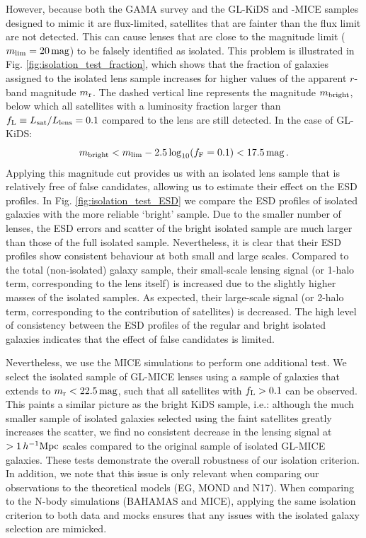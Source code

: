 \documentclass[usenatbib]{mnras}
\newcommand{\hMpc}{\, h^{-1}{\rm{Mpc}} }
\newcommand{\magn}{\, {\rm mag} }
\newcommand{\un}[1]{_{\rm #1}}
\begin{document}
However, because both the GAMA survey and the GL-KiDS and -MICE samples designed to mimic it are flux-limited, satellites that are fainter than the flux limit are not detected. This can cause lenses that are close to the magnitude limit ($m\un{lim}=20 \magn$) to be falsely identified as isolated. This problem is illustrated in Fig. \ref{fig:isolation_test_fraction}, which shows that the fraction of galaxies assigned to the isolated lens sample increases for higher values of the apparent $r$-band magnitude $m\un{r}$. The dashed vertical line represents the magnitude $m\un{bright}$, below which all satellites with a luminosity fraction larger than $f\un{L} \equiv L\un{sat}/L\un{lens}=0.1$ compared to the lens are still detected. In the case of GL-KiDS:
\begin{equation}
	m\un{bright} < m\un{lim} - 2.5 \log_{10}(f\un{F}=0.1) < 17.5 \magn \, .
\end{equation}
Applying this magnitude cut provides us with an isolated lens sample that is relatively free of false candidates, allowing us to estimate their effect on the ESD profiles. In Fig. \ref{fig:isolation_test_ESD} we compare the ESD profiles of isolated galaxies with the more reliable `bright' sample. Due to the smaller number of lenses, the ESD errors and scatter of the bright isolated sample are much larger than those of the full isolated sample. Nevertheless, it is clear that their ESD profiles show consistent behaviour at both small and large scales. Compared to the total (non-isolated) galaxy sample, their small-scale lensing signal (or 1-halo term, corresponding to the lens itself) is increased due to the slightly higher masses of the isolated samples. As expected, their large-scale signal (or 2-halo term, corresponding to the contribution of satellites) is decreased. The high level of consistency between the ESD profiles of the regular and bright isolated galaxies indicates that the effect of false candidates is limited.

Nevertheless, we use the MICE simulations to perform one additional test. We select the isolated sample of GL-MICE lenses using a sample of galaxies that extends to $m\un{r}<22.5 \magn$, such that all satellites with $f\un{L}>0.1$ can be observed. This paints a similar picture as the bright KiDS sample, i.e.: although the much smaller sample of isolated galaxies selected using the faint satellites greatly increases the scatter, we find no consistent decrease in the lensing signal at $>1\hMpc$ scales compared to the original sample of isolated GL-MICE galaxies. These tests demonstrate the overall robustness of our isolation criterion. In addition, we note that this issue is only relevant when comparing our observations to the theoretical models (EG, MOND and N17). When comparing to the N-body simulations (BAHAMAS and MICE), applying the same isolation criterion to both data and mocks ensures that any issues with the isolated galaxy selection are mimicked.
\end{document}
